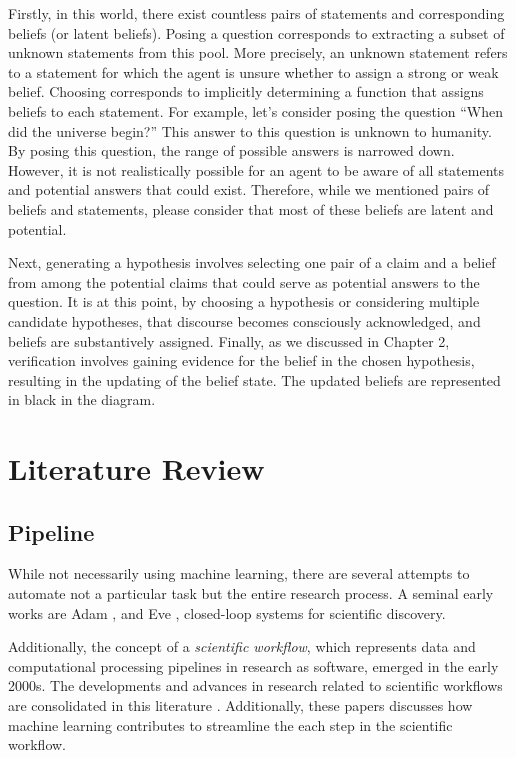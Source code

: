 \documentclass{book}
\begin{document}
Firstly, in this world, there exist countless pairs of statements and corresponding beliefs (or latent beliefs). Posing a question corresponds to extracting a subset of unknown statements from this pool. More precisely, an unknown statement refers to a statement for which the agent is unsure whether to assign a strong or weak belief. Choosing corresponds to implicitly determining a function that assigns beliefs to each statement. For example, let's consider posing the question ``When did the universe begin?'' This answer to this question is unknown to humanity. By posing this question, the range of possible answers is narrowed down. However, it is not realistically possible for an agent to be aware of all statements and potential answers that could exist. Therefore, while we mentioned pairs of beliefs and statements, please consider that most of these beliefs are latent and potential.

Next, generating a hypothesis involves selecting one pair of a claim and a belief from among the potential claims that could serve as potential answers to the question. It is at this point, by choosing a hypothesis or considering multiple candidate hypotheses, that discourse becomes consciously acknowledged, and beliefs are substantively assigned. Finally, as we discussed in Chapter 2, verification involves gaining evidence for the belief in the chosen hypothesis, resulting in the updating of the belief state. The updated beliefs are represented in black in the diagram.

\chapter{Literature Review}
\label{chapter-literature-review}

\section{Pipeline}
While not necessarily using machine learning, there are several attempts to automate not a particular task but the entire research process. A seminal early works are Adam \cite{king2004functional}, and Eve \cite{williams2015cheaper}, closed-loop systems for scientific discovery. 

Additionally, the concept of a \textit{scientific workflow}, which represents data and computational processing pipelines in research as software, emerged in the early 2000s. The developments and advances in research related to scientific workflows are consolidated in this literature \cite{barker2008scientific,atkinson2017scientific}. Additionally, these papers \cite{deelman2019role,nouri2021exploring} discusses how machine learning contributes to streamline the each step in the scientific workflow.
\end{document}
